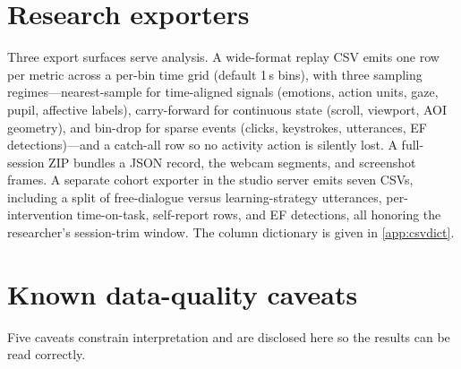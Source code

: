 \section{Research exporters}
\label{sec:sensing-export}

Three export surfaces serve analysis. A wide-format replay CSV emits one
row per metric across a per-bin time grid (default 1\,s bins), with three
sampling regimes---nearest-sample for time-aligned signals (emotions,
action units, gaze, pupil, affective labels), carry-forward for continuous
state (scroll, viewport, AOI geometry), and bin-drop for sparse events
(clicks, keystrokes, utterances, EF detections)---and a catch-all row so
no activity action is silently lost. A full-session ZIP bundles a JSON
record, the webcam segments, and screenshot frames. A separate cohort
exporter in the studio server emits seven CSVs, including a split of
free-dialogue versus learning-strategy utterances, per-intervention
time-on-task, self-report rows, and EF detections, all honoring the
researcher's session-trim window. The column dictionary is given in
\cref{app:csvdict}.

\section{Known data-quality caveats}
\label{sec:sensing-caveats}

Five caveats constrain interpretation and are disclosed here so the
results can be read correctly.

